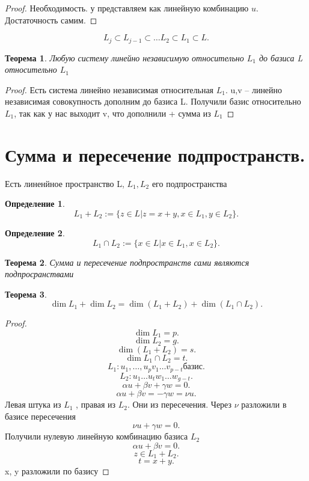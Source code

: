 \documentclass{scrartcl}
\newtheorem{theorem}{Теорема}
\newtheorem{definition}{Определение}
\begin{document}
\begin{proof}
    Необходимость. у представляем как линейную комбинацию $u$.
    Достаточность самим.
\end{proof}
\[
L_{j}\subset L_{j - 1}\subset \dots L_2 \subset L_1 \subset L
.\] 
\begin{theorem}
    Любую систему линейно независимую относительно $L_1$ до базиса L относительно $L_1$
\end{theorem}
\begin{proof}
    Есть система линейно независимая относительная $L_1$. u,v -- линейно независимая совокупность дополним до базиса L. Получили базис относительно $L_1$, так как у нас выходит v, что дополнили + сумма из  $L_1$
\end{proof}
\section{Сумма и пересечение подпространств.}
Есть линенйное пространство L, $L_1,L_2$  его подпространства
\begin{definition}
    \[
        L_1 + L_2 := \{z  \in L | z = x + y, x \in L_1, y \in L_2\}
    .\] 
\end{definition}
\begin{definition}
    \[
        L_1 \cap L_2 := \{x \in L | x \in L_1,x\in L_2\}
    .\] 
\end{definition}
\begin{theorem}
    Сумма и пересечение подпространств сами являются подпросранствами
\end{theorem}
\begin{theorem}
    \[
        \dim{L_1} + \dim{L_2} = \dim{(L_1 +  L_2)} + \dim{(L_1 \cap L_2)}
    .\] 
\end{theorem}
\begin{proof}
    \[
    \dim{L_1} = p
    .\] 
    \[
        \dim{L_2}  = g
    .\] 
    \[
        \dim{(L_1 + L_2)} = s
    .\] 
    \[
        \dim{L_1 \cap L_2} = t
    .\] 
   \[
       L_1 : u_1,\dots ,u_{p} v_1 \dots v_{p - t} \text{базис}
   .\] 
   \[
   L_2 : u_1 \dots u_{t} w_1 \dots w_{g - t}
   .\] 
   \[
   \alpha u + \beta v  + \gamma w =  0
   .\] 
   \[
   \alpha u + \beta v  = -\gamma w = \nu u
   .\] 
   Левая штука из $L_1$ , правая из $L_2$. Они из пересечения. Через $\nu$ разложили в базисе пересечения
    \[
   \nu u + \gamma w = 0
   .\] 
   Получили нулевую линейную комбинацию базиса $L_2$
   \[
   \alpha u + \beta v = 0
   .\] 
   \[
   z \in L_1 + L_2
   .\]  
   \[
   t = x + y 
   .\] 
   x, y разложили по базису
\end{proof}
\end{document}
